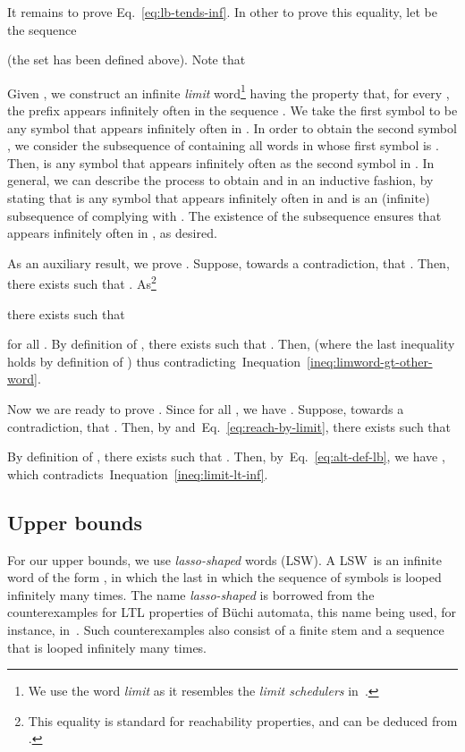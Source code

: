 \documentclass[final,3p,times,twocolumn]{elsarticle}
\theoremstyle{plain}
\theoremstyle{definition}
\newcommand{\recallEquation}[1]{Eq.~\ref{#1}}
\newcommand{\recallInequation}[1]{Inequation~\ref{#1}}
\newcommand{\lsw}{LSW}
\begin{document}
It remains to prove \recallEquation{eq:lb-tends-inf}. In
other to prove this equality, let
 be the sequence

(the set  has been defined above). Note that
 
Given , we construct an infinite \emph{limit} word\footnote{We use the word
\emph{limit} as it resembles the \emph{limit schedulers}
in~\cite{DBLP:journals/entcs/GiroD09}.}  having the property that,
for every , the prefix  appears infinitely often in
the sequence .
We take the first symbol  to be any symbol that appears
infinitely often in .
In order to obtain the second symbol , we consider
the subsequence  of  containing all words in  whose
first symbol is . Then,  is any symbol
that appears infinitely often as the second symbol in 
. In general, we can
describe the process to obtain  and 
in an inductive fashion,  by stating that  is any symbol that
appears infinitely often in  and
 is an (infinite) subsequence of  complying with
. The existence of the subsequence  
ensures that  appears infinitely often in
, as desired.

As an auxiliary result, we prove .
Suppose, towards a contradiction, that .
Then, there exists  such that
.
As\footnote{This equality is standard for reachability properties, and can
be deduced from
.}

there exists  such that

for all .
By definition of , there exists  such that
. Then,
 (where the last inequality holds by
definition of ) thus
contradicting~\recallInequation{ineq:limword-gt-other-word}.

Now we are ready to prove .
Since  for all , we have
. Suppose, towards a
contradiction, that . Then, by
 and~\recallEquation{eq:reach-by-limit},
there exists  such that

By definition of , there exists  such that
.
Then, by~\recallEquation{eq:alt-def-lb}, we have
, which
contradicts~\recallInequation{ineq:limit-lt-inf}.

\subsection{Upper bounds}

For our upper bounds, we use \emph{lasso-shaped} words (\lsw). A \lsw\ is an
infinite word of the form
, in which the last 
in which the sequence of symbols  is looped
infinitely many times. The name \emph{lasso-shaped} is borrowed from the
counterexamples for LTL properties of B\"uchi automata, this name being used,
for instance, in~\cite{DBLP:conf/tacas/SchuppanB05}. Such counterexamples also
consist of a finite stem and a sequence that is looped infinitely many times.
\end{document}
